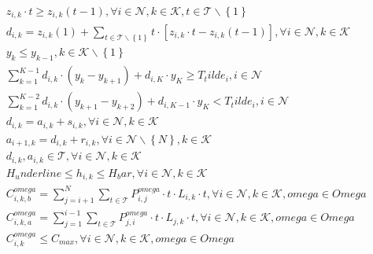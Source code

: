 \begin{align}
  & z_{i , k} \cdot t \geq z_{i , k} \left(t - 1\right) , \forall i \in \mathbf{\mathcal{N}} , k \in \mathbf{\mathcal{K}} , t \in \mathbf{\mathcal{T}} \backslash \left\{1\right\} \tag{eq\_0002} \\
  & d_{i , k} = z_{i , k} \left(1\right) + \underset{t \in \mathbf{\mathcal{T}} \backslash \left\{1\right\}}{\sum} t \cdot \left[z_{i , k} \cdot t - z_{i , k} \left(t - 1\right)\right] , \forall i \in \mathbf{\mathcal{N}} , k \in \mathbf{\mathcal{K}} \tag{eq\_0003} \\
  & y_{k} \leq y_{k - 1} , k \in \mathbf{\mathcal{K}} \backslash \left\{1\right\} \tag{eq\_0005} \\
  & \sum_{k = 1}^{K - 1} d_{i , k} \cdot \left(y_{k} - y_{k + 1}\right) + d_{i , K} \cdot y_{K} \geq T_tilde_{i} , i \in \mathbf{\mathcal{N}} \tag{eq\_0006} \\
  & \sum_{k = 1}^{K - 2} d_{i , k} \cdot \left(y_{k + 1} - y_{k + 2}\right) + d_{i , K - 1} \cdot y_{K} < T_tilde_{i} , i \in \mathbf{\mathcal{N}} \tag{eq\_0007} \\
  & d_{i , k} = a_{i , k} + s_{i , k} , \forall i \in \mathbf{\mathcal{N}} , k \in \mathbf{\mathcal{K}} \tag{eq\_0008} \\
  & a_{i + 1 , k} = d_{i , k} + r_{i , k} , \forall i \in \mathbf{\mathcal{N}} \backslash \left\{N\right\} , k \in \mathbf{\mathcal{K}} \tag{eq\_0009} \\
  & d_{i , k} , a_{i , k} \in \mathbf{\mathcal{T}} , \forall i \in \mathbf{\mathcal{N}} , k \in \mathbf{\mathcal{K}} \tag{eq\_0010} \\
  & H_underline \leq h_{i , k} \leq H_bar , \forall i \in \mathbf{\mathcal{N}} , k \in \mathbf{\mathcal{K}} \tag{eq\_0012} \\
  & C_{i , k , b}^{\mathit{omega}} = \sum_{j = i + 1}^{N} \underset{t \in \mathbf{\mathcal{T}}}{\sum} P_{i , j}^{\mathit{omega}} \cdot t \cdot L_{i , k} \cdot t , \forall i \in \mathbf{\mathcal{N}} , k \in \mathbf{\mathcal{K}} , \mathit{omega} \in \mathit{Omega} \tag{eq\_0013} \\
  & C_{i , k , a}^{\mathit{omega}} = \sum_{j = 1}^{i - 1} \underset{t \in \mathbf{\mathcal{T}}}{\sum} P_{j , i}^{\mathit{omega}} \cdot t \cdot L_{j , k} \cdot t , \forall i \in \mathbf{\mathcal{N}} , k \in \mathbf{\mathcal{K}} , \mathit{omega} \in \mathit{Omega} \tag{eq\_0014} \\
  & C_{i , k}^{\mathit{omega}} \leq C_{\mathit{max}} , \forall i \in \mathbf{\mathcal{N}} , k \in \mathbf{\mathcal{K}} , \mathit{omega} \in \mathit{Omega} \tag{eq\_0016} \\

\end{align}
